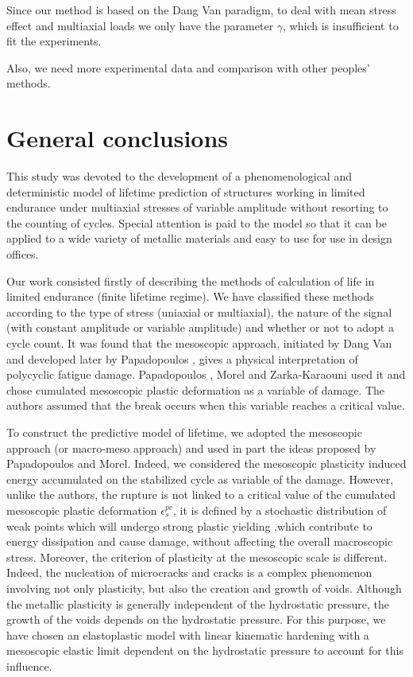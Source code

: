 \documentclass[3p,times,number,review]{elsarticle}
\begin{document}
Since our method is based on the Dang Van paradigm, to deal with mean stress effect and multiaxial loads we only have the parameter $\gamma$, which is insufficient to fit the experiments.

Also, we need more experimental data and comparison with other peoples' methods.

\section{General conclusions}
This study was devoted to the development of a phenomenological and deterministic model of lifetime prediction of structures working in limited endurance under multiaxial stresses of variable amplitude without resorting to the counting of cycles. Special attention is paid to the model so that it can be applied to a wide variety of metallic materials and easy to use for use in design offices.

Our work consisted firstly of describing the methods of calculation of life in limited endurance (finite lifetime regime). We have classified these methods according to the type of stress (uniaxial or multiaxial), the nature of the signal (with constant amplitude or variable amplitude) and whether or not to adopt a cycle count. It was found that the mesoscopic approach, initiated by Dang Van \cite{van1986criterion} and developed later by Papadopoulos \cite{papadopoulos2001long}, gives a physical interpretation of polycyclic fatigue damage. Papadopoulos \cite{papadopoulos2001long}, Morel \cite{FFE:FFE452} and Zarka-Karaouni \cite{de2013comportement} used it and chose cumulated mesoscopic plastic deformation as a variable of damage. The authors assumed that the break occurs when this variable reaches a critical value.

To construct the predictive model of lifetime, we adopted the mesoscopic approach (or macro-meso approach) and used in part the ideas proposed by Papadopoulos and Morel. Indeed, we considered the mesoscopic plasticity induced energy accumulated on the stabilized cycle as variable of the damage. However, unlike the authors, the rupture is not linked to a critical value of the cumulated mesoscopic plastic deformation $\epsilon^{pc}_s$, it is defined by a stochastic distribution of weak points which will undergo strong plastic yielding ,which contribute to energy dissipation and cause
damage, without affecting the overall macroscopic stress. Moreover, the criterion of plasticity at the mesoscopic scale is different. Indeed, the nucleation of microcracks and cracks is a complex phenomenon involving not only plasticity, but also the creation and growth of voids. Although the metallic plasticity is generally independent of the hydrostatic pressure, the growth of the voids depends on the hydrostatic pressure. For this purpose, we have chosen an elastoplastic model with linear kinematic hardening with a mesoscopic elastic limit dependent on the hydrostatic pressure to account for this influence.
\end{document}
